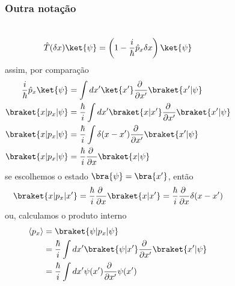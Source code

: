 \documentclass[12pt,brazil,table]{beamer}
\begin{document}
\begin{frame}
  \frametitle{Outra notação}
  \fontsize{7pt}{11pt}\selectfont
  
  \begin{columns}[T]
  \[
    \hat{T}(\delta x)\ket{\psi} = \left( 1- \dfrac{i}{\hbar}\hat{p}_x\delta x\right)\ket{\psi}
  \]
  assim, por comparação\vspace*{-0.25cm}
  \[
    \begin{align*}
    \dfrac{i}{\hbar}\hat{p}_x\ket{\psi} &= \int dx'\ket{x'}\dfrac{\partial\;}{\partial x'}\braket{x'|\psi}\\
    \braket{x|p_x|\psi} &= \dfrac{\hbar}{i} \int dx'\braket{x|x'}\dfrac{\partial\;}{\partial x'}\braket{x'|\psi}\\
    \braket{x|p_x|\psi} &= \dfrac{\hbar}{i} \int \delta (x-x')\dfrac{\partial\;}{\partial x'}\braket{x'|\psi}\\
    \braket{x|p_x|\psi} &= \dfrac{\hbar}{i} \dfrac{\partial\;}{\partial x}\braket{x|\psi}
    \end{align*}\vspace*{-0.25cm}
  \]
  se escolhemos o estado $\bra{\psi}=\bra{x'}$, então\vspace*{-0.25cm}
  \[
   \braket{x|p_x|x'} = \dfrac{\hbar}{i} \dfrac{\partial\;}{\partial x}\braket{x|x'} = \dfrac{\hbar}{i} \dfrac{\partial\;}{\partial x}\delta (x-x')\vspace*{-0.25cm}
  \]
  ou, calculamos o produto interno\vspace*{-0.25cm}
  \[
    \begin{align*}
      \langle p_x \rangle &= \braket{\psi|p_x|\psi}\\
      &= \dfrac{\hbar}{i} \int dx'\braket{\psi|x'}\dfrac{\partial\;}{\partial x'}\braket{x'|\psi}\\
      &= \dfrac{\hbar}{i} \int dx' \psi(x')\dfrac{\partial\;}{\partial x'}\psi(x')
    \end{align*}
  \]





\end{columns}
\end{frame}
\end{document}
